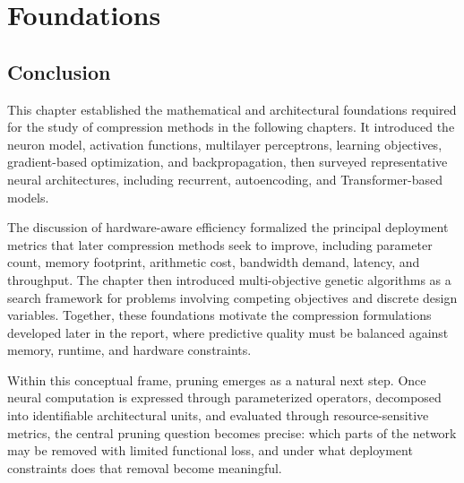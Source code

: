 
\chapter{Foundations}








%


\section{Conclusion}

This chapter established the mathematical and architectural foundations required for the study of compression methods in the following chapters. It introduced the neuron model, activation functions, multilayer perceptrons, learning objectives, gradient-based optimization, and backpropagation, then surveyed representative neural architectures, including recurrent, autoencoding, and Transformer-based models.

\noindent The discussion of hardware-aware efficiency formalized the principal deployment metrics that later compression methods seek to improve, including parameter count, memory footprint, arithmetic cost, bandwidth demand, latency, and throughput. The chapter then introduced multi-objective genetic algorithms as a search framework for problems involving competing objectives and discrete design variables. Together, these foundations motivate the compression formulations developed later in the report, where predictive quality must be balanced against memory, runtime, and hardware constraints.

\noindent Within this conceptual frame, pruning emerges as a natural next step. Once neural computation is expressed through parameterized operators, decomposed into identifiable architectural units, and evaluated through resource-sensitive metrics, the central pruning question becomes precise: which parts of the network may be removed with limited functional loss, and under what deployment constraints does that removal become meaningful.
